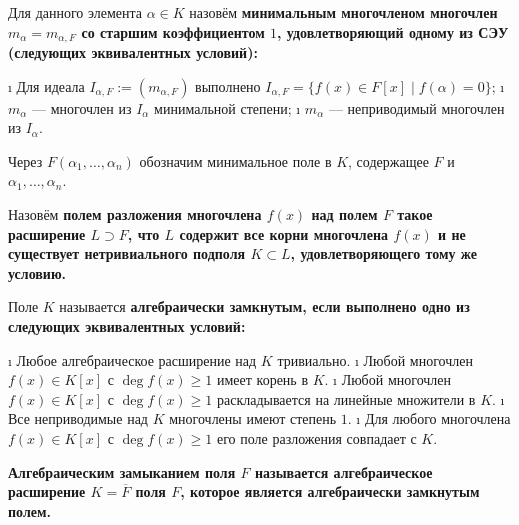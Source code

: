 \begin{defn}
Для данного элемента \(\alpha \in K\) назовём \bf{минимальным многочленом} многочлен \(m_{\alpha} = m_{\alpha,F}\) со старшим коэффициентом \(1\), удовлетворяющий одному из СЭУ (следующих эквивалентных условий):

\begin{enumerate}
\def\labelenumi{\arabic{enumi}.}
\tightlist
\i
  Для идеала \(I_{\alpha, F} := (m_{\alpha, F})\) выполнено \(I_{\alpha,F} = \{f(x) \in F[x] \mid f(\alpha)=0\}\);
\i
  \(m_{\alpha}\) --- многочлен из \(I_{\alpha}\) минимальной степени;
\i
  \(m_{\alpha}\) --- неприводимый многочлен из \(I_{\alpha}\).
\end{enumerate}

\end{defn}

\begin{defn}
Через \(F(\alpha_1,\ldots,\alpha_n)\) обозначим минимальное поле в \(K\), содержащее \(F\) и \(\alpha_1,\ldots,\alpha_n\).
\end{defn}

\begin{defn}
Назовём \bf{полем разложения} многочлена \(f(x)\) над полем \(F\) такое расширение \(L \supset F\), что \(L\) содержит все корни многочлена \(f(x)\) и не существует нетривиального подполя \(K \subset L\), удовлетворяющего тому же условию.
\end{defn}

\begin{defn}
Поле \(K\) называется \bf{алгебраически замкнутым}, если выполнено одно из следующих эквивалентных условий:

\begin{enumerate}
\def\labelenumi{(\arabic{enumi})}
\tightlist
\i
  Любое алгебраическое расширение над \(K\) тривиально.
\i
  Любой многочлен \(f(x) \in K[x]\) с \(\deg f(x) \geq 1\) имеет корень в \(K\).
\i
  Любой многочлен \(f(x) \in K[x]\) с \(\deg f(x) \geq 1\) раскладывается на линейные множители в \(K\).
\i
  Все неприводимые над \(K\) многочлены имеют степень \(1\).
\i
  Для любого многочлена \(f(x) \in K[x]\) с \(\deg f(x) \geq 1\) его поле разложения совпадает с \(K\).
\end{enumerate}

\end{defn}

\begin{defn}
\bf{Алгебраическим замыканием} поля \(F\) называется алгебраическое расширение \(K=\overline{F}\) поля \(F\), которое является алгебраически замкнутым полем.

\end{defn}

